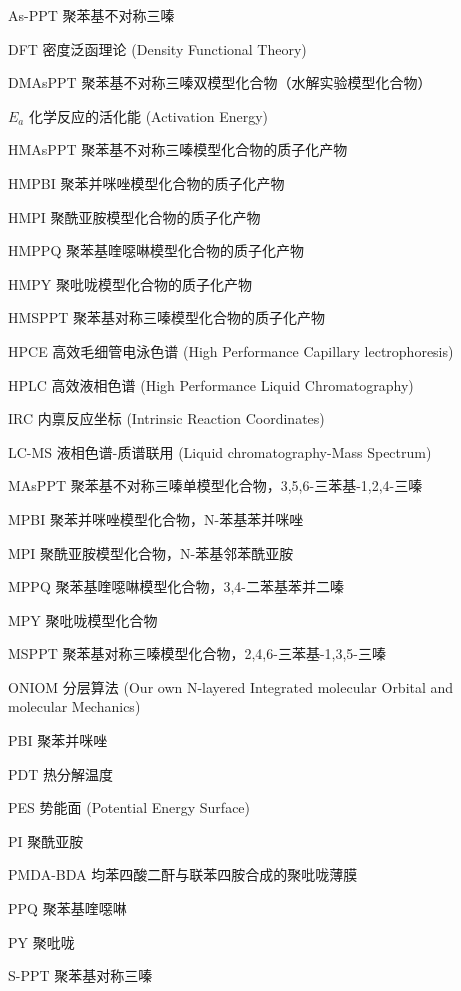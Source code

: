 \begin{denotation}[3cm]
  \item[As-PPT]聚苯基不对称三嗪
  \item[DFT]密度泛函理论 (Density Functional Theory)
  \item[DMAsPPT]聚苯基不对称三嗪双模型化合物（水解实验模型化合物）
  \item[$E_a$]化学反应的活化能 (Activation Energy)
  \item[HMAsPPT]聚苯基不对称三嗪模型化合物的质子化产物
  \item[HMPBI]聚苯并咪唑模型化合物的质子化产物
  \item[HMPI]聚酰亚胺模型化合物的质子化产物
  \item[HMPPQ]聚苯基喹噁啉模型化合物的质子化产物
  \item[HMPY]聚吡咙模型化合物的质子化产物
  \item[HMSPPT]聚苯基对称三嗪模型化合物的质子化产物
  \item[HPCE]高效毛细管电泳色谱 (High Performance Capillary lectrophoresis)
  \item[HPLC]高效液相色谱 (High Performance Liquid Chromatography)
  \item[IRC]内禀反应坐标 (Intrinsic Reaction Coordinates)
  \item[LC-MS]液相色谱-质谱联用 (Liquid chromatography-Mass Spectrum)
  \item[MAsPPT]聚苯基不对称三嗪单模型化合物，3,5,6-三苯基-1,2,4-三嗪
  \item[MPBI]聚苯并咪唑模型化合物，N-苯基苯并咪唑
  \item[MPI]聚酰亚胺模型化合物，N-苯基邻苯酰亚胺
  \item[MPPQ]聚苯基喹噁啉模型化合物，3,4-二苯基苯并二嗪
  \item[MPY]聚吡咙模型化合物
  \item[MSPPT]聚苯基对称三嗪模型化合物，2,4,6-三苯基-1,3,5-三嗪
  \item[ONIOM]分层算法 (Our own N-layered Integrated molecular Orbital and molecular Mechanics)
  \item[PBI]聚苯并咪唑
  \item[PDT]热分解温度
  \item[PES]势能面 (Potential Energy Surface)
  \item[PI]聚酰亚胺
  \item[PMDA-BDA]均苯四酸二酐与联苯四胺合成的聚吡咙薄膜
  \item[PPQ]聚苯基喹噁啉
  \item[PY]聚吡咙
  \item[S-PPT]聚苯基对称三嗪

\end{denotation}
